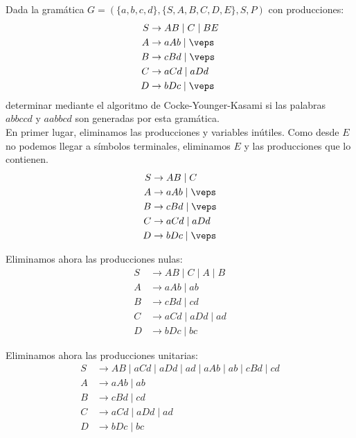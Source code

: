 \begin{ejercicio}\label{ej:1.6.15}
    Dada la gramática $G=(\{a,b,c,d\},\{S,A,B,C,D,E\},S,P)$ con producciones:
    \begin{align*}
        S &\rightarrow AB \mid C \mid BE \\
        A &\rightarrow aAb \mid \veps \\
        B &\rightarrow cBd \mid \veps \\
        C &\rightarrow aCd \mid aDd \\
        D &\rightarrow bDc \mid \veps
    \end{align*}
    determinar mediante el algoritmo de Cocke-Younger-Kasami si las palabras $abbccd$ y $aabbcd$ son generadas por esta gramática.\\

    En primer lugar, eliminamos las producciones y variables inútiles. Como desde $E$ no podemos llegar a símbolos terminales, eliminamos $E$ y las producciones que lo contienen.
    \begin{align*}
        S &\rightarrow AB \mid C \\
        A &\rightarrow aAb \mid \veps \\
        B &\rightarrow cBd \mid \veps \\
        C &\rightarrow aCd \mid aDd \\
        D &\rightarrow bDc \mid \veps
    \end{align*}

    Eliminamos ahora las producciones nulas:
    \begin{align*}
        S &\rightarrow AB \mid C \mid A \mid B\\
        A &\rightarrow aAb \mid ab \\
        B &\rightarrow cBd \mid cd \\
        C &\rightarrow aCd \mid aDd \mid ad\\
        D &\rightarrow bDc \mid bc
    \end{align*}

    Eliminamos ahora las producciones unitarias:
    \begin{align*}
        S &\rightarrow AB \mid aCd \mid aDd \mid ad \mid aAb \mid ab \mid cBd \mid cd \\
        A &\rightarrow aAb \mid ab \\
        B &\rightarrow cBd \mid cd \\
        C &\rightarrow aCd \mid aDd \mid ad\\
        D &\rightarrow bDc \mid bc
    \end{align*}


\end{ejercicio}
